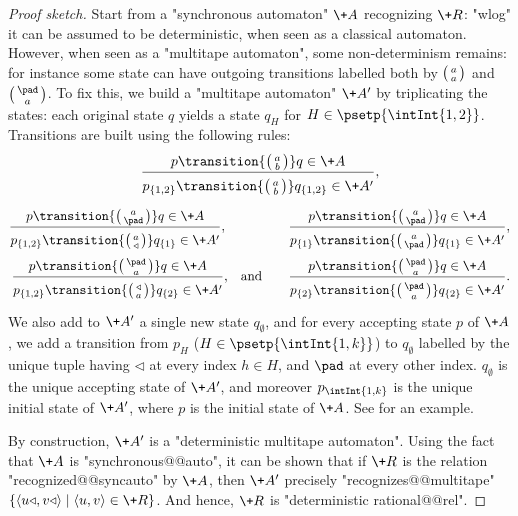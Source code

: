 \begin{proof}[Proof sketch]
	Start from a "synchronous automaton" $\+A$ recognizing $\+R$:
	"wlog" it can be assumed to be deterministic, when seen 
	as a classical automaton. However, when seen as a "multitape automaton", some non-determinism 
	remains: for instance some state can have outgoing transitions labelled both
	by $\pair{a}{a}$ and $\pair{\pad}{a}$.
	To fix this, we build a "multitape automaton" $\+A'$ by triplicating the states:
	each original state $q$ yields a state $q_H$ for $H \in \psetp{\intInt{1,2}}$.
	Transitions are built using the following rules:
	\[
		\frac{
			p \transition{\pair{a}{b}} q \in \+A
		}{
			p_{\{1,2\}} \transition{\pair{a}{b}} q_{\{1,2\}} \in \+A'
			\vphantom{\Big()}
		},
	\]
	\vspace{-2em}
	\begin{align*}
		\frac{
			p \transition{\pair{a}{\pad}} q \in \+A
		}{
			p_{\{1,2\}} \transition{\pair{a}{\triangleleft}} q_{\{1\}} \in \+A'
			\vphantom{\Big()}
		},\hphantom{\quad and}\qquad
		& 
		\frac{
			p \transition{\pair{a}{\pad}} q \in \+A	
		}{
			p_{\{1\}} \transition{\pair{a}{\pad}} q_{\{1\}} \in \+A'
			\vphantom{\Big()}
		}, \\
		\frac{
			p \transition{\pair{\pad}{a}} q \in \+A
		}{
			p_{\{1,2\}} \transition{\pair{\triangleleft}{a}} q_{\{2\}} \in \+A'
			\vphantom{\Big()}
		}\text{,\quad and}\qquad
		& 
		\frac{
			p \transition{\pair{\pad}{a}} q \in \+A
		}{
			p_{\{2\}} \transition{\pair{\pad}{a}} q_{\{2\}} \in \+A'
			\vphantom{\Big()}
		}.\\
	\end{align*}
	We also add to $\+A'$ a single new state $q_{\emptyset}$, and for every accepting state $p$ of
	$\+A$, we add a transition from $p_H$ ($H \in \psetp{\intInt{1,k}}$) to $q_{\emptyset}$
	labelled by the unique tuple having $\triangleleft$ at every index $h \in H$,
	and $\pad$ at every other index.
	$q_{\emptyset}$ is the unique accepting state of $\+A'$, and moreover
	$p_{\intInt{1,k}}$ is the unique initial state of $\+A'$, where $p$ is the initial state of $\+A$. See  for an example.
	
	By construction, $\+A'$ is a "deterministic multitape automaton". 
	Using the fact that $\+A$ is "synchronous@@auto", it can be shown that
	if $\+R$ is the relation "recognized@@syncauto" by $\+A$, then $\+A'$ precisely 
	"recognizes@@multitape" $\{\tup{u\triangleleft,v\triangleleft} \mid \tup{u,v} \in \+R\}$.
	And hence, $\+R$ is "deterministic rational@@rel".
\end{proof}

